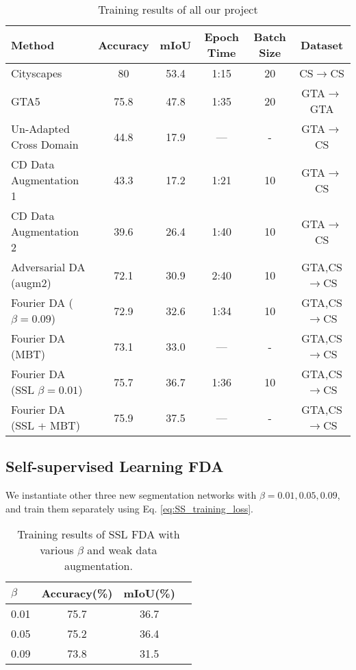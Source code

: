 \documentclass[10pt,twocolumn,letterpaper]{article}
\begin{document}
\begin{table*}[t]
  \centering
  \begin{tabular}{@{}lccccc@{}}
    \toprule
    Method & Accuracy & mIoU & Epoch Time & Batch Size & Dataset\\
    \midrule
    Cityscapes & 80 & 53.4 & 1:15 & 20 & CS$\rightarrow$CS \\
    GTA5 & 75.8 & 47.8 & 1:35 & 20 & GTA$\rightarrow$GTA\\
    Un-Adapted Cross Domain & 44.8 & 17.9 & --- & - & GTA$\rightarrow$CS\\
    CD Data Augmentation 1 & 43.3 & 17.2 & 1:21 & 10 & GTA$\rightarrow$CS\\
    CD Data Augmentation 2 & 39.6 & 26.4 & 1:40 & 10 & GTA$\rightarrow$CS\\
    Adversarial DA (augm2) & 72.1 & 30.9 & 2:40 & 10 & GTA,CS$\rightarrow$CS\\
    Fourier DA ($\beta=0.09$) & 72.9 & 32.6 & 1:34 & 10 & GTA,CS$\rightarrow$CS\\
    Fourier DA (MBT) & 73.1 & 33.0 & --- & - & GTA,CS$\rightarrow$CS\\
    Fourier DA (SSL $\beta=0.01$) & 75.7 & 36.7 & 1:36 & 10 & GTA,CS$\rightarrow$CS\\
    Fourier DA (SSL + MBT) & 75.9 & 37.5 & --- & - & GTA,CS$\rightarrow$CS\\
    \bottomrule
  \end{tabular}
  \caption{Training results of all our project}
  \label{tab:result}
\end{table*}

\subsection{Self-supervised Learning FDA}

We instantiate other three new segmentation networks with $\beta = 0.01, 0.05, 0.09$, and train them separately using Eq. \eqref{eq:SS_training_loss}.

\begin{table}[h]
  \centering
  \begin{tabular}{@{}lccc@{}}
  \toprule
  $\beta$ & Accuracy(\%) & mIoU(\%) \\
  \midrule
    0.01 & 75.7 & 36.7 \\
    0.05 & 75.2 & 36.4 \\
    0.09 & 73.8 & 31.5 \\
    \bottomrule
  \end{tabular}
  \caption{Training results of SSL FDA with various $\beta$ and weak data augmentation.}
  \label{tab:ss_fda}
\end{table}
\end{document}
